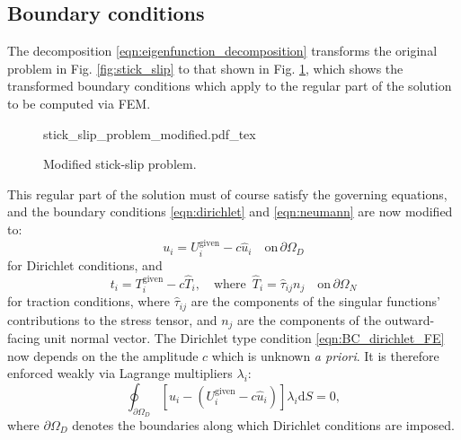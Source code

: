 \documentclass[12pt,a4paper]{article}
\numberwithin{equation}{section}
\newcommand{\D}{\mathrm{d}}
\begin{document}
\subsection{Boundary conditions}

The decomposition \eqref{eqn:eigenfunction_decomposition} transforms the original problem in Fig. \ref{fig:stick_slip} to that shown in Fig. \ref{fig:modified_stick_slip}, which shows the transformed boundary conditions which apply to the regular part of the solution to be computed via FEM. 
\begin{figure}
  {stick_slip_problem_modified.pdf_tex}
  \vspace{5mm}
  \caption{Modified stick-slip problem.}
  \label{fig:modified_stick_slip}
\end{figure}
This regular part of the solution must of course satisfy the governing equations, and the boundary conditions \eqref{eqn:dirichlet} and \eqref{eqn:neumann} are now modified to:
\begin{equation}
  u_i = U^{\text{given}}_i - c \hat u_i \quad\text{on}\,\partial\Omega_D
  \label{eqn:BC_dirichlet_FE}
\end{equation}
for Dirichlet conditions, and
\begin{equation}
  t_i = T^{\text{given}}_i - c \hat T_i, \quad\text{where }\, \hat T_i = \hat\tau_{ij}n_j \quad\text{on}\,\partial\Omega_N
  \label{eqn:BC_dirichlet_neumann}
\end{equation}
for traction conditions, where $\hat\tau_{ij}$ are the components of the singular functions' contributions to the stress tensor, and $n_j$ are the components of the outward-facing unit normal vector. The Dirichlet type condition \eqref{eqn:BC_dirichlet_FE} now depends on the the amplitude $c$ which is unknown \emph{a priori}. It is therefore enforced weakly via Lagrange multipliers $\lambda_i$:
\begin{equation}
  \oint_{\partial\Omega_D}\left[u_i - (U_i^{\text{given}}-c\hat u_i)\right]\lambda_i \D S = 0,
  \label{eqn:weak_BC_lagrange_mpy}
\end{equation}
where $\partial\Omega_D$ denotes the boundaries along which Dirichlet conditions are imposed.
\end{document}
